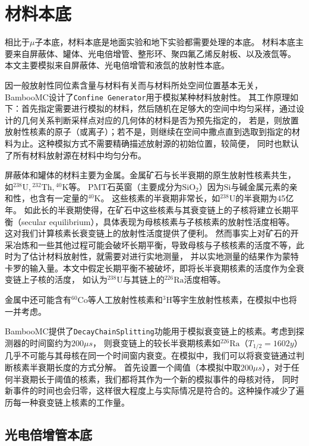 \section{材料本底}

相比于$\mu$子本底，材料本底是地面实验和地下实验都需要处理的本底。
材料本底主要来自屏蔽体、罐体、光电倍增管、整形环、聚四氟乙烯反射板、以及液氙等。
本文主要模拟来自屏蔽体、光电倍增管和液氙的放射性本底。

因一般放射性同位素含量与材料有关而与材料所处空间位置基本无关，BambooMC设计了\verb|Confine Generator|用于模拟某种材料放射性。
其工作原理如下：首先指定需要进行模拟的材料，然后随机在足够大的空间中均匀采样，通过设计的几何关系判断采样点对应的几何体的材料是否为预先指定的，
若是，则放置放射性核素的原子（或离子）；若不是，则继续在空间中撒点直到选取到指定的材料为止。这种模拟方式不需要精确描述放射源的初始位置，较简便，
同时也默认了所有材料放射源在材料中均匀分布。

屏蔽体和罐体的材料主要为金属。金属矿石与长半衰期的原生放射性核素共生，
如${}^{238}\mathrm{U},{}^{232}\mathrm{Th},{}^{40}\mathrm{K}$等。
PMT石英窗（主要成分为$\mathrm{Si}\mathrm{O}_2$）因为$\mathrm{Si}$与碱金属元素的亲和性，也含有一定量的${}^{40}\mathrm{K}$。
这些核素的半衰期非常长，如${}^{238}\mathrm{U}$的半衰期为45亿年。
如此长的半衰期使得，在矿石中这些核素与其衰变链上的子核将建立长期平衡（secular equilibrium），具体表现为母核核素与子核核素的放射性活度相等。
这对我们计算核素长衰变链上的放射性活度提供了便利。
然而事实上对矿石的开采冶炼和一些其他过程可能会破坏长期平衡，导致母核与子核核素的活度不等，此时为了估计材料放射性，就需要对进行实地测量，
并以实地测量的结果作为蒙特卡罗的输入量。本文中假定长期平衡不被破坏，即将长半衰期核素的活度作为全衰变链上子核的活度，
如认为${}^{238}\mathrm{U}$与其链上的${}^{226}\mathrm{Ra}$活度相等。

金属中还可能含有${}^{60}\mathrm{Co}$等人工放射性核素和${}^{3}\mathrm{H}$等宇生放射性核素，在模拟中也将一并考虑。

BambooMC提供了\verb|DecayChainSplitting|功能用于模拟衰变链上的核素。考虑到探测器的时间窗约为$200\mu s$，
则衰变链上的较长半衰期核素如${}^{226}\mathrm{Ra}$（$T_{1/2}=1602y$）几乎不可能与其母核在同一个时间窗内衰变。在模拟中，我们可以将衰变链通过判断核素半衰期长度的方式分解。
首先设置一个阈值（本模拟中取$200\mu s$），对于任何半衰期长于阈值的核素，我们都将其作为一个新的模拟事件的母核对待，
同时新事件的时间也会归零，这样很大程度上与实际情况是符合的。这种操作减少了遍历每一种衰变链上核素的工作量。

\subsection{光电倍增管本底}
\label{sec:pmt_background}

